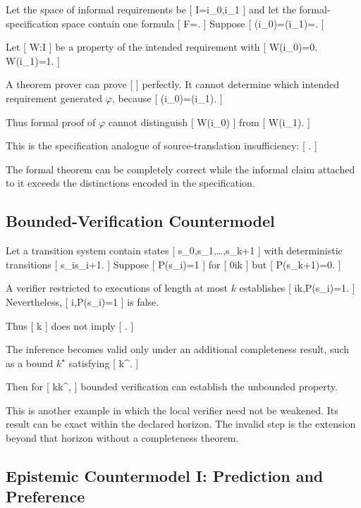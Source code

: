 \documentclass[11pt]{article}
\begin{document}
Let the space of informal requirements be
[
I={i_0,i_1}
]
and let the formal-specification space contain one formula
[
F={\varphi}.
]
Suppose
[
\sigma(i_0)=\sigma(i_1)=\varphi.
]

Let
[
W:I
]
be a property of the intended requirement with
[
W(i_0)=0,
\qquad
W(i_1)=1.
]

A theorem prover can prove
[
\varphi
]
perfectly. It cannot determine which intended requirement generated $\varphi$, because
[
\sigma(i_0)=\sigma(i_1).
]

Thus formal proof of $\varphi$ cannot distinguish
[
W(i_0)
]
from
[
W(i_1).
]

This is the specification analogue of source-translation insufficiency:
[
\not\Rightarrow
{}.
]

The formal theorem can be completely correct while the informal claim attached to it exceeds the distinctions encoded in the specification.

\subsection{Bounded-Verification Countermodel}

Let a transition system contain states
[
s_0,s_1,\ldots,s_{k+1}
]
with deterministic transitions
[
s_i\to s_{i+1}.
]
Suppose
[
P(s_i)=1
]
for
[
0\leq i\leq k
]
but
[
P(s_{k+1})=0.
]

A verifier restricted to executions of length at most $k$ establishes
[
\forall i\leq k,\quad P(s_i)=1.
]
Nevertheless,
[
\forall i,\quad P(s_i)=1
]
is false.

Thus
[
\leq k
]
does not imply
[
.
]

The inference becomes valid only under an additional completeness result, such as a bound $k^\star$ satisfying
[
\leq k^\star.
]

Then for
[
k\geq k^\star,
]
bounded verification can establish the unbounded property.

This is another example in which the local verifier need not be weakened. Its result can be exact within the declared horizon. The invalid step is the extension beyond that horizon without a completeness theorem.

\subsection{Epistemic Countermodel I: Prediction and Preference}
\end{document}
